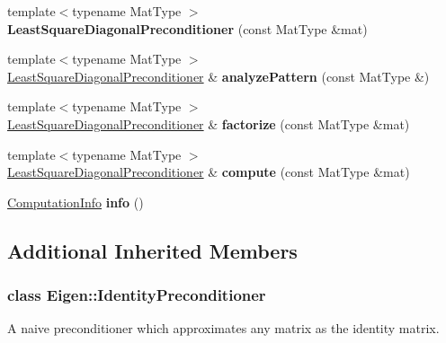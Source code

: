 \begin{DoxyCompactItemize}
{\footnotesize template$<$typename Mat\+Type $>$ }\\{\bfseries Least\+Square\+Diagonal\+Preconditioner} (const Mat\+Type \&mat)
\item 
\mbox{\label{group___iterative_linear_solvers___module_af1d3a3dbe081bdb667a5596491d7ad47}} 
{\footnotesize template$<$typename Mat\+Type $>$ }\\\hyperlink{group___iterative_linear_solvers___module_class_eigen_1_1_least_square_diagonal_preconditioner}{Least\+Square\+Diagonal\+Preconditioner} \& {\bfseries analyze\+Pattern} (const Mat\+Type \&)
\item 
\mbox{\label{group___iterative_linear_solvers___module_a831492d2cecddc28b48ce53ddb4bc295}} 
{\footnotesize template$<$typename Mat\+Type $>$ }\\\hyperlink{group___iterative_linear_solvers___module_class_eigen_1_1_least_square_diagonal_preconditioner}{Least\+Square\+Diagonal\+Preconditioner} \& {\bfseries factorize} (const Mat\+Type \&mat)
\item 
\mbox{\label{group___iterative_linear_solvers___module_a05eb1d791e2265e9110ba3bb8d717cfe}} 
{\footnotesize template$<$typename Mat\+Type $>$ }\\\hyperlink{group___iterative_linear_solvers___module_class_eigen_1_1_least_square_diagonal_preconditioner}{Least\+Square\+Diagonal\+Preconditioner} \& {\bfseries compute} (const Mat\+Type \&mat)
\item 
\mbox{\label{group___iterative_linear_solvers___module_a648044dd59ff3b09cf4efa7fe49d5208}} 
\hyperlink{group__enums_ga85fad7b87587764e5cf6b513a9e0ee5e}{Computation\+Info} {\bfseries info} ()
\end{DoxyCompactItemize}
\subsection*{Additional Inherited Members}
\label{class_eigen_1_1_identity_preconditioner}
\subsubsection{class Eigen\+:\+:Identity\+Preconditioner}
A naive preconditioner which approximates any matrix as the identity matrix. 


